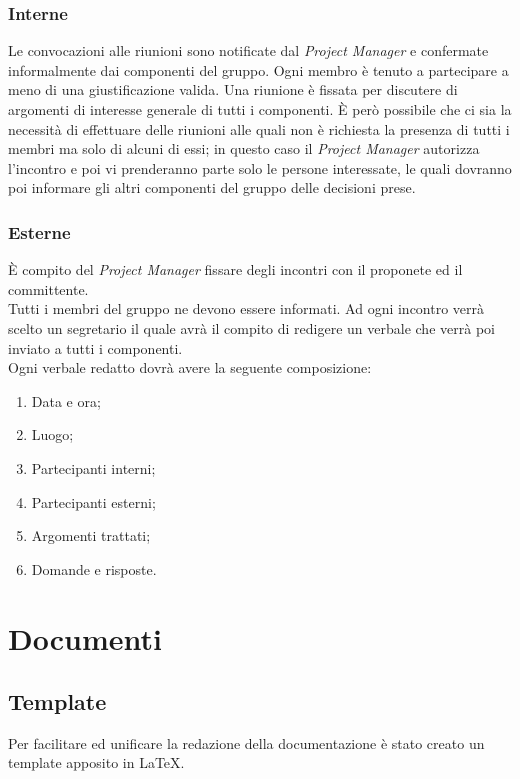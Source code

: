 \documentclass[12pt,a4paper,titlepage]{article}
\begin{document}
\subsubsection{Interne}
Le convocazioni alle riunioni sono notificate dal \textit{Project Manager} e confermate informalmente dai componenti del gruppo. Ogni membro è tenuto a partecipare a meno di una giustificazione valida. Una riunione è fissata per discutere di argomenti di interesse generale di tutti i componenti. È però possibile che ci sia la necessità di effettuare delle riunioni alle quali non è richiesta la presenza di tutti i membri ma solo di alcuni di essi; in questo caso il \textit{Project Manager} autorizza l'incontro e poi vi prenderanno parte solo le persone interessate, le quali dovranno poi informare gli altri componenti del gruppo delle decisioni prese.

\subsubsection{Esterne}
È compito del \textit{Project Manager} fissare degli incontri con il proponete ed il committente.\\
Tutti i membri del gruppo ne devono essere informati. Ad ogni incontro verrà scelto un 
segretario il quale avrà il compito di redigere un verbale che verrà poi inviato a tutti
i componenti.\\
Ogni verbale redatto dovrà avere la seguente composizione: 
\begin{enumerate}
\item Data e ora;
\item Luogo;
\item Partecipanti interni;
\item Partecipanti esterni;
\item Argomenti trattati;
\item Domande e risposte.
\end{enumerate}
\newpage

\section{Documenti}
\subsection{Template}
Per facilitare ed unificare la redazione della documentazione è stato creato un 
template apposito in \LaTeX.
\end{document}
